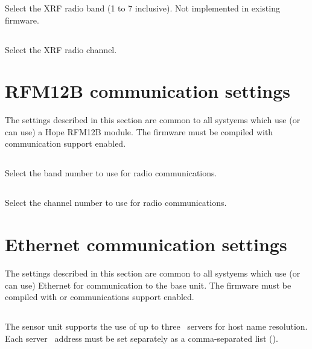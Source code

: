 Select the XRF radio band (1 to 7 inclusive). Not implemented in
existing firmware.

\subsection[radio-xrf-channel]{}

Select the XRF radio channel. 


\section{RFM12B communication settings}

The settings described in this section are common to all systyems
which use (or can use) a Hope RFM12B module. The firmware must be
compiled with  communication support enabled.

\subsection[radio-rfm12b-band]{}

Select the band number to use for radio communications. 

\subsection[radio-rfm12b-channel]{}

Select the channel number to use for radio communications.


\section{Ethernet communication settings}

The settings described in this section are common to all systyems
which use (or can use) Ethernet for communication to the base unit.
The firmware must be compiled with  or 
communications support enabled.

\subsection[dns1, dns2, dns3]{\newline {}\newline {}}
The sensor unit supports the use of up to three \dns\ servers for host
name resolution. Each server \ip\ address must be set separately as a
comma-separated list ().


